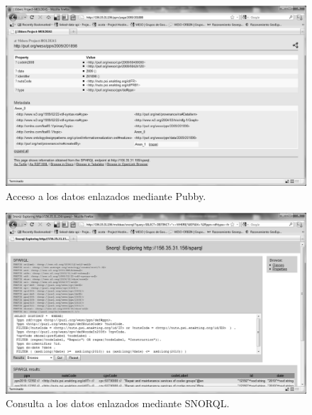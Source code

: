 \begin{figure}[!htb]
\centering
	\includegraphics[width=14cm]{images/phd/moldeas/moldeas-pubby}
\caption{Acceso a los datos enlazados mediante Pubby.}
\label{fig:moldeas-pubby-screen}
\end{figure}



\begin{figure}[!htb]
\centering
	\includegraphics[width=14cm]{images/phd/moldeas/moldeas-snorql}
\caption{Consulta a los datos enlazados mediante SNORQL.}
\label{fig:moldeas-snorql-screen}
\end{figure}

